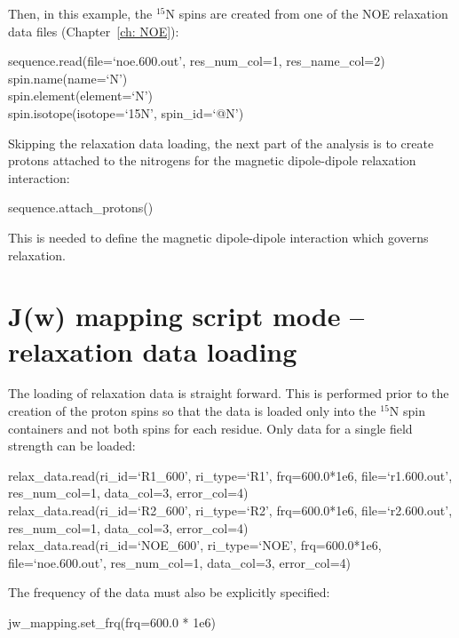 Then, in this example, the $^{15}$N spins are created from one of the NOE relaxation data files (Chapter~\ref{ch: NOE}):

\begin{exampleenv}
sequence.read(file=`noe.600.out', res\_num\_col=1, res\_name\_col=2) \\
spin.name(name=`N') \\
spin.element(element=`N') \\
spin.isotope(isotope=`15N', spin\_id=`@N')
\end{exampleenv}

Skipping the relaxation data loading, the next part of the analysis is to create protons attached to the nitrogens for the magnetic dipole-dipole relaxation interaction:

\begin{exampleenv}
sequence.attach\_protons()
\end{exampleenv}

This is needed to define the magnetic dipole-dipole interaction which governs relaxation.




\section{J(w) mapping script mode -- relaxation data loading}

The loading of relaxation data is straight forward.  This is performed prior to the creation of the proton spins so that the data is loaded only into the $^{15}$N spin containers and not both spins for each residue.  Only data for a single field strength can be loaded:

\begin{exampleenv}
relax\_data.read(ri\_id=`R1\_600',  ri\_type=`R1',  frq=600.0*1e6, file=`r1.600.out', res\_num\_col=1, data\_col=3, error\_col=4) \\
relax\_data.read(ri\_id=`R2\_600',  ri\_type=`R2',  frq=600.0*1e6, file=`r2.600.out', res\_num\_col=1, data\_col=3, error\_col=4) \\
relax\_data.read(ri\_id=`NOE\_600', ri\_type=`NOE', frq=600.0*1e6, file=`noe.600.out', res\_num\_col=1, data\_col=3, error\_col=4)
\end{exampleenv}

The frequency of the data must also be explicitly specified:

\begin{exampleenv}
jw\_mapping.set\_frq(frq=600.0 * 1e6) \\
\end{exampleenv}



